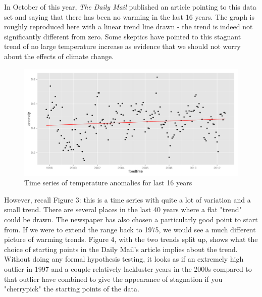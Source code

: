\documentclass{article}\usepackage{graphicx, color}
\newenvironment{knitrout}{}{} %
\begin{document}
In October of this year, \emph{The Daily Mail} published an article pointing to this data set and saying that there has been no warming in the last 16 years. The graph is roughly reproduced here with a linear trend line drawn - the trend is indeed not significantly different from zero. Some skeptics have pointed to this stagnant trend of no large temperature increase as evidence that we should not worry about the effects of climate change.  \begin{figure}[H]
\begin{knitrout}
\color{fgcolor}\includegraphics[width=\linewidth]{figure/15-years} 
\end{knitrout}

\caption{\label{last16}Time series of temperature anomalies for last 16 years}
\end{figure}
However, recall Figure 3: this is a time series with quite a lot of variation and a small trend. There are several places in the last 40 years where a flat "trend" could be drawn. The newspaper has also chosen a particularly good point to start from. If we were to extend the range back to 1975, we would see a much different picture of warming trends. Figure 4, with the two trends split up, shows what the choice of starting points in the Daily Mail's article implies about the trend. Without doing any formal hypothesis testing, it looks as if an extremely high outlier in 1997 and a couple relatively lackluster years in the 2000s compared to that outlier have combined to give the appearance of stagnation if you "cherrypick" the starting points of the data.
\end{document}
